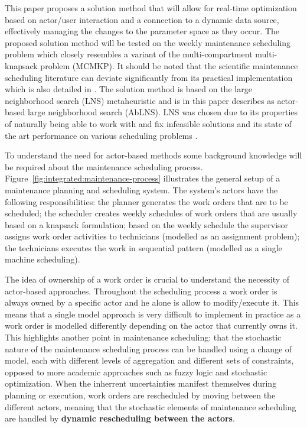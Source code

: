 This paper proposes a solution method that will allow for real-time optimization
based on actor/user interaction and a connection to a dynamic data source,
effectively managing the changes to the parameter space as they occur. The proposed solution
method will be tested on the weekly maintenance scheduling problem \citet{palmerMaintenancePlanningScheduling2019}
which closely resembles a variant of the multi-compartment multi-knapsack problem (MCMKP). It
should be noted that the scientific maintenance scheduling literature can deviate
significantly from its practical implementation which is also detailed in
\citep{palmerMaintenancePlanningScheduling2019}. The solution method is
based on the large neighborhood search (LNS) metaheuristic and is in this
paper describes as actor-based large neighborhood search (AbLNS). LNS
was chosen due to its properties of naturally being able to work with and fix
infeasible solutions and its state of the art performance on various scheduling
problems \citep{gendreauHandbookMetaheuristics2019}.

To understand the need for actor-based methods some
background knowledge will be required about the maintenance scheduling process.
Figure~\ref{fig:integrated:maintenance-process} illustrates the general setup
of a maintenance planning and scheduling system. The system's actors
have the following responsibilities: the planner generates the work orders that
are to be scheduled; the scheduler creates weekly schedules of work orders that are
usually based on a knapsack
formulation; based on the weekly schedule the supervisor assigns work order
activities to technicians (modelled as an assignment problem); the
technicians executes the work in sequential pattern (modelled as a single machine scheduling).

The idea of ownership of a work order is crucial to understand the necessity of
actor-based approaches. Throughout the scheduling process a
work order is always owned by a specific actor and he alone is allow to modify/execute it. This
means that a single model approach is very difficult to implement in practice
as a work order is modelled differently depending on the actor that currently
owns it. This highlights another point in maintenance scheduling: that
the stochastic nature of the maintenance scheduling process can be handled using
a change of model, each with different levels of aggregation and different sets
of constraints, opposed to more academic approaches such as fuzzy logic and
stochastic optimization. When the inherrent uncertainties manifest themselves
during planning or execution, work orders are rescheduled by moving between
the different actors, meaning that the stochastic elements of maintenance
scheduling are handled by \textbf{dynamic rescheduling between the actors}.

